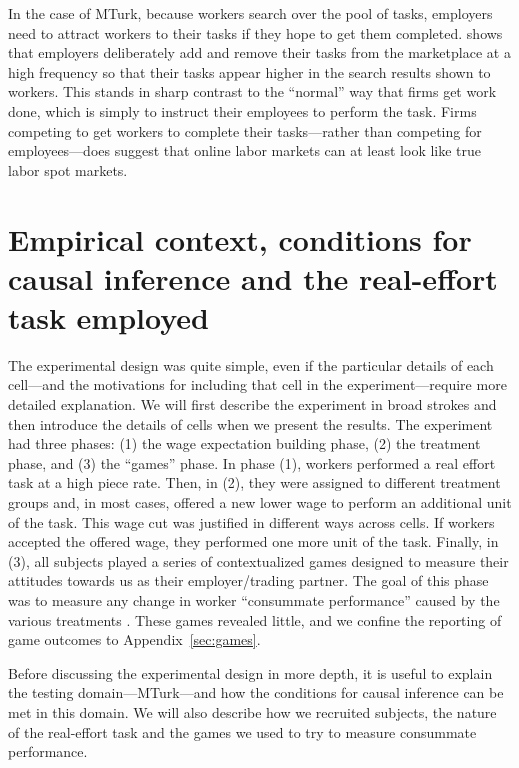 \documentclass[11pt]{article}
\begin{document}
In the case of MTurk, because workers search over the pool of tasks, employers need to attract workers to their tasks if they hope to get them completed.
\cite{chilton2010task} shows that employers deliberately add and remove their tasks from the marketplace at a high frequency  so that their tasks appear higher in the search results shown to workers. 
This stands in sharp contrast to the ``normal'' way that firms get work done, which is simply to instruct their employees to perform the task.  
Firms competing to get workers to complete their tasks---rather than competing for employees---does suggest that online labor markets can at least look like true labor spot markets. 

\section{Empirical context, conditions for causal inference and the real-effort task employed}
The experimental design was quite simple, even if the particular details of each cell---and the motivations for including that cell in the experiment---require more detailed explanation.
We will first describe the experiment in broad strokes and then introduce the details of cells when we present the results.
The experiment had three phases: (1) the wage expectation building phase, (2) the treatment phase, and (3) the ``games'' phase. 
In phase (1), workers performed a real effort task at a high piece rate.
Then, in (2), they were assigned to different treatment groups and, in most cases, offered a new lower wage to perform an additional unit of the task.
This wage cut was justified in different ways across cells. 
If workers accepted the offered wage, they performed one more unit of the task.
Finally, in (3), all subjects played a series of contextualized games designed to measure their attitudes towards us as their employer/trading partner.
The goal of this phase was to measure any change in worker
``consummate performance'' caused by the various treatments \citep{hart2008contracts}.
These games revealed little, and we confine the reporting of game outcomes to Appendix~\ref{sec:games}. 

Before discussing the experimental design in more depth, it is useful to explain the testing domain---MTurk---and how the conditions for causal inference can be met in this domain.
We will also describe how we recruited subjects, the nature of the real-effort task and the games we used to try to measure consummate performance. 
\end{document}
